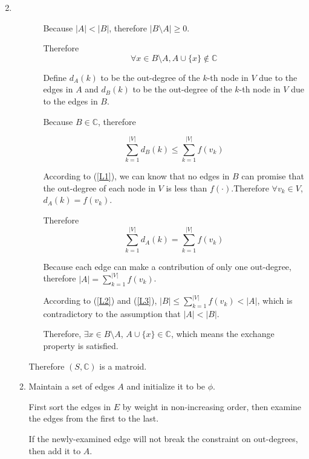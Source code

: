 \documentclass[12pt,a4paper]{article}
\makeatletter
\newtheorem*{solution}{Solution}
\theoremstyle{definition}
\renewenvironment{solution}[1][Solution] {\par\pushQED{\qed}\normalfont\topsep6\p@\@plus6\p@\relax\trivlist\item[\hskip\labelsep\bfseries#1\@addpunct{.}]\ignorespaces}{\popQED\endtrivlist\@endpefalse} \makeatother
\makeatother
\begin{document}
\begin{enumerate}
\begin{solution}
\begin{enumerate}
\begin{itemize}
    		    	Because $|A|<|B|$, therefore $|B\setminus A|\ge 0$.
    		    	
    		    	Therefore 
    		    	\begin{equation}\label{L1}
    		    	    \forall x \in B \setminus A, A\cup\{x\} \notin \mathbb{C}
    		    	\end{equation}
    		    	
    		    	Define $d_A(k)$ to be the out-degree of the $k$-th node in $V$ due to the edges in $A$ and $d_B(k)$ to be the out-degree of the $k$-th node in $V$ due to the edges in $B$.
    		    	
    		    	Because $B\in \mathbb{C}$, therefore 
    		    	
    		    	\begin{equation}\label{L2}
    		    	    \sum_{k=1}^{|V|} d_B(k) \le \sum_{k=1}^{|V|} f(v_k)
    		    	\end{equation}
    		    	
    		    	According to (\ref{L1}), we can know that no edges in $B$ can promise that the out-degree of each node in $V$ is less than $f(\cdot)$.Therefore $\forall v_k\in V$,$d_A(k)=f(v_k)$.
    		    	
    		    	Therefore 
    		    	\begin{equation}\label{L3}
    		    	    \sum_{k=1}^{|V|} d_A(k)=\sum_{k=1}^{|V|} f(v_k)
    		    	\end{equation}
    		    	
    		    	Because each edge can make a contribution of only one out-degree, therefore $|A|=\sum_{k=1}^{|V|} f(v_k)$.
    		    	
    		    	According to (\ref{L2}) and (\ref{L3}), $|B|\le \sum_{k=1}^{|V|} f(v_k)<|A|$, which is contradictory to the assumption that $|A|<|B|$.
    		    	
    		    	Therefore, $\exists x \in B\setminus A$, $A\cup \{x\} \in \mathbb{C}$, which means the exchange property is satisfied.
    		    \end{itemize}
    	            Therefore $(S,\mathbb{C})$ is a matroid.
    	    \item 
    	        Maintain a set of edges $A$ and initialize it to be $\phi$.
    	    
    	        First sort the edges in $E$ by weight in non-increasing order, then examine the edges from the first to the last. 
    	        
    	        If the newly-examined edge will not break the constraint on out-degrees, then add it to $A$.
    	        

\end{enumerate}
\end{solution}
\end{enumerate}
\end{document}

